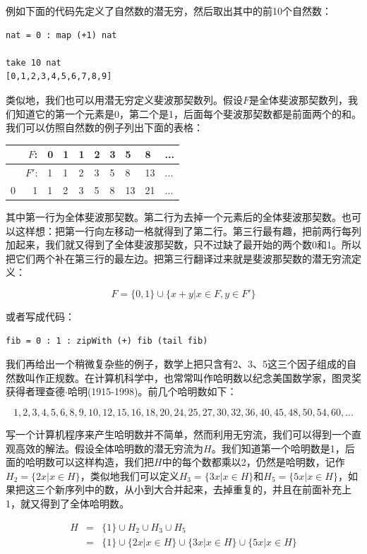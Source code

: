 \documentclass{article}
\begin{document}
例如下面的代码先定义了自然数的潜无穷，然后取出其中的前10个自然数：

\lstset{frame=single}
\begin{lstlisting}
nat = 0 : map (+1) nat

take 10 nat
[0,1,2,3,4,5,6,7,8,9]
\end{lstlisting}

类似地，我们也可以用潜无穷定义斐波那契数列。假设$F$是全体斐波那契数列，我们知道它的第一个元素是0，第二个是1，后面每个斐波那契数都是前面两个的和。我们可以仿照自然数的例子列出下面的表格：

\begin{tabular}{|r|r|l|l|l|l|l|l|l|l|}
\hline
  & $F$:  & 0 & 1 & 1 & 2 & 3 & 5 & 8 & ... \\
\hline
  & $F'$: & 1 & 1 & 2 & 3 & 5 & 8 & 13 & ... \\
\hline
0 & 1     & 1 & 2 & 3 & 5 & 8 & 13 & 21 & ... \\
\hline
\end{tabular}

其中第一行为全体斐波那契数。第二行为去掉一个元素后的全体斐波那契数。也可以这样想：把第一行向左移动一格就得到了第二行。第三行最有趣，把前两行每列加起来，我们就又得到了全体斐波那契数，只不过缺了最开始的两个数0和1。所以把它们两个补在第三行的最左边。把第三行翻译过来就是斐波那契数的潜无穷流定义：

\[
F = \{0, 1\} \cup \{ x + y | x \in F, y \in F'\}
\]

或者写成代码：
\begin{lstlisting}
fib = 0 : 1 : zipWith (+) fib (tail fib)
\end{lstlisting}

 
我们再给出一个稍微复杂些的例子，数学上把只含有2、3、5这三个因子组成的自然数叫作正规数。在计算机科学中，也常常叫作哈明数以纪念美国数学家，图灵奖获得者理查德$\cdot$哈明(1915-1998)。前几个哈明数如下：

\[
1, 2, 3, 4, 5, 6, 8, 9, 10, 12, 15, 16, 18, 20, 24, 25, 27, 30, 32, 36, 40, 45, 48, 50, 54, 60, ...
\]

写一个计算机程序来产生哈明数并不简单，然而利用无穷流，我们可以得到一个直观高效的解法。假设全体哈明数的潜无穷流为$H$。我们知道第一个哈明数是1，后面的哈明数可以这样构造，我们把$H$中的每个数都乘以2，仍然是哈明数，记作$H_2 = \{ 2x | x \in H \}$，类似地我们可以定义$H_3 = \{ 3x | x \in H \}$和$H_5 = \{ 5x | x \in H \}$，如果把这三个新序列中的数，从小到大合并起来，去掉重复的，并且在前面补充上1，就又得到了全体哈明数。

\[
\begin{array}{rcl}
H & = & \{ 1 \} \cup H_2 \cup H_3 \cup H_5 \\
  & = & \{ 1 \} \cup \{ 2x | x \in H \} \cup \{ 3x | x \in H \} \cup \{ 5x | x \in H \} \\
\end{array}
\]
\end{document}

